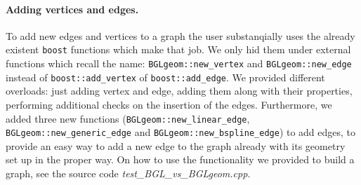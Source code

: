 \documentclass[11pt]{article} %
\begin{document}
		\paragraph{Adding vertices and edges.} To add new edges and vertices to a graph the user substanqially uses the already existent \texttt{boost} functions which make that job. We only hid them under external functions which recall the name: \texttt{BGLgeom::new\_vertex} and \texttt{BGLgeom::new\_edge} instead of \texttt{boost::add\_vertex} of \texttt{boost::add\_edge}. We provided different overloads: just adding vertex and edge, adding them along with their properties, performing additional checks on the insertion of the edges. Furthermore, we added three new functions (\texttt{BGLgeom::new\_linear\_edge}, \texttt{BGLgeom::new\_generic\_edge} and \texttt{BGLgeom::new\_bspline\_edge}) to add edges, to provide an easy way to add a new edge to the graph already with its geometry set up in the proper way.	On how to use the functionality we provided to build a graph, see the source code \textit{test\_BGL\_vs\_BGLgeom.cpp}.
			
\end{document}
